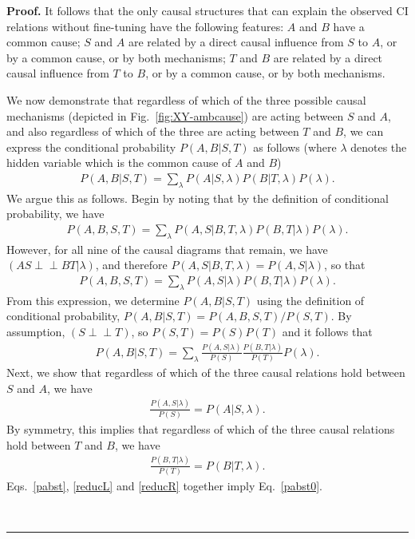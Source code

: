 \documentclass[letterpaper,onecolumn,nofootinbib]{revtex4}
\newenvironment{proof}[1][Proof]{\noindent\textbf{#1.} }{\ \rule{0.5em}{0.5em}}
\def\indep{\perp\!\!\!\!\perp}
\begin{document}
\begin{proof}
It follows that the only causal structures that can explain the observed CI relations without fine-tuning have the following features: $A$ and $B$ have a common cause;
$S$ and $A$ are related by a direct causal influence from $S$ to $A$, or by a common cause,
 or by both mechanisms; 
 $T$ and $B$ are related by a direct causal influence from $T$ to $B$, or by a common cause,
 or by both mechanisms. 

We now demonstrate that regardless of which of the three possible causal mechanisms (depicted in Fig.~\ref{fig:XY-ambcause}) are acting between $S$ and $A$, and also regardless of which of the three are acting between $T$ and $B$, we can express the conditional probability $P(A,B|S,T)$ as follows (where $\lambda$ denotes the hidden variable which is the common cause of $A$ and $B$)
\begin{eqnarray}\label{pabst0}
P(A,B|S,T) = \sum_{\lambda}  P(A|S,\lambda) P(B|T,\lambda) P(\lambda).
\end{eqnarray}
We argue this as follows.  Begin by noting that by the definition of conditional probability, we have
\begin{eqnarray}
P(A,B,S,T) = \sum_{\lambda} P(A,S|B,T, \lambda) P(B,T|\lambda) P(\lambda).
\end{eqnarray}
However, for all nine of the causal diagrams that remain, we have $\left(AS \indep BT | \lambda \right)$, and therefore $P(A,S|B,T, \lambda)=P(A,S|\lambda)$, so that 
\begin{eqnarray}
P(A,B,S,T) = \sum_{\lambda} P(A,S| \lambda) P(B,T|\lambda) P(\lambda).
\end{eqnarray}
From this expression, we determine $P(A,B|S,T)$ using the definition of conditional probability, $P(A,B|S,T)=P(A,B,S,T)/P(S,T)$.  By assumption, $\left(S \indep T\right)$, so $P(S,T)=P(S)P(T)$ and it follows that
\begin{eqnarray}\label{pabst}
P(A,B|S,T) = \sum_{\lambda}  \frac{ P(A,S| \lambda)}{P(S)}  \frac{ P(B,T| \lambda)}{P(T)}  P(\lambda).
\end{eqnarray}
Next, we show that regardless of which of the three causal relations hold between $S$ and $A$, we have
\begin{eqnarray}\label{reducL}
\frac{ P(A,S| \lambda)}{P(S)} = P(A|S,\lambda).
\end{eqnarray}
By symmetry, this implies that regardless of which of the three causal relations hold between $T$ and $B$, we have
\begin{eqnarray}\label{reducR}
\frac{ P(B,T| \lambda)}{P(T)} = P(B|T,\lambda).
\end{eqnarray}
Eqs.~\eqref{pabst}, \eqref{reducL} and \eqref{reducR} together imply Eq.~\eqref{pabst0}.


\end{proof}
\end{document}
